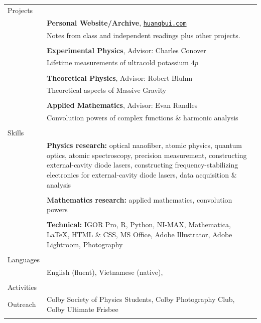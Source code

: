 \documentclass[10pt]{article}
\begin{document}
\begin{longtable}{ l m{13.5cm}   }
  \large{Projects}		& \\ 
  						& \textbf{Personal Website/Archive}, \href{https://huanqbui.com}{\texttt{huanqbui.com}} \\
  						& Notes from class and independent readings plus other projects.\\
  						& \\
  
  						& \textbf{Experimental Physics}, Advisor: Charles Conover \\
  						& Lifetime measurements of ultracold potassium $4p$\\
  						& \\
  						 
  						& \textbf{Theoretical Physics}, Advisor: Robert Bluhm\\
  						& Theoretical aspects of Massive Gravity\\
  						& \\
  						 
  						& \textbf{Applied Mathematics}, Advisor: Evan Randles\\
  						& Convolution powers of complex functions \& harmonic analysis\\
  						& \\
  						 
  						 
  \large{Skills}      	& \\ 
  						& \textbf{Physics research:} optical nanofiber, atomic physics, quantum optics, atomic spectroscopy, precision measurement, constructing external-cavity diode lasers, constructing frequency-stabilizing electronics for external-cavity diode lasers, data acquisition \& analysis \\
  						& \\
  						& \textbf{Mathematics research:} applied mathematics, convolution powers \\
  						& \\
  						& \textbf{Technical:} IGOR Pro, R, Python,  NI-MAX, Mathematica, \LaTeX{}, HTML \& CSS, MS Office,  Adobe Illustrator, Adobe Lightroom, Photography \\ 
  						& \\
  						 
  				

  \large{Languages}     & \\
  						& English (fluent), Vietnamese (native), \\
						& \\
  						 
  \large{Activities}    & \\ 
  \large{Outreach}	& Colby Society of Physics Students, Colby Photography Club, Colby Ultimate Frisbee \\
     					& \\
  
  
  
\end{longtable}
\end{document}
